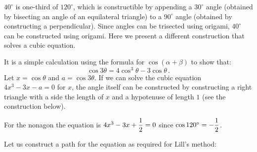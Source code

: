 $40^\circ$ is one-third of $120^\circ$, which is constructible by appending a $30^\circ$ angle (obtained by bisecting an angle of an equilateral triangle) to a $90^\circ$ angle (obtained by constructing a perpendicular). Since angles can be trisected using origami, $40^\circ$ can be constructed using origami. Here we present a different construction that solves a cubic equation.

It is a simple calculation using the formula for $\cos(\alpha+\beta)$ to show that:
\[
\cos 3\theta=4\cos^3 \theta -3\cos\theta\,.
\]
Let $x=\cos \theta$ and $a=\cos 3\theta$. If we can solve the cubic equation $4x^3-3x-a=0$ for $x$, the angle itself can be constructed by constructing a right triangle with a side the length of $x$ and a hypotenuse of length $1$ (see the construction below).

For the nonagon the equation is $4x^3-3x+\displaystyle\frac{1}{2}=0$ since $\cos 120^\circ=-\displaystyle\frac{1}{2}$.

Let us construct a path for the equation as required for Lill's method:

